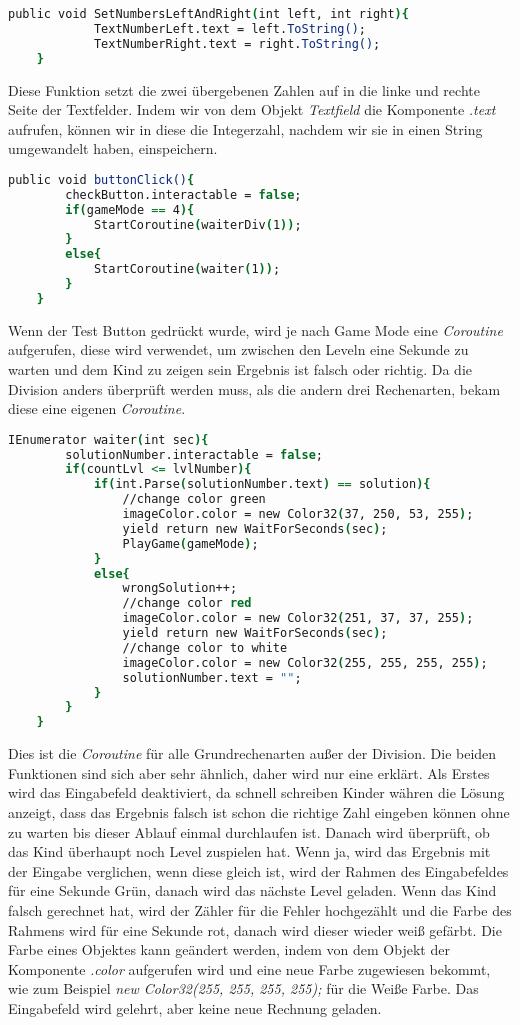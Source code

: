\begin{lstlisting}[language=csh, caption={MathOperations.cs SetTextLeftAndRight Funktion}]
	public void SetNumbersLeftAndRight(int left, int right){
			TextNumberLeft.text = left.ToString();
			TextNumberRight.text = right.ToString();
	}
\end{lstlisting}
Diese Funktion setzt die zwei übergebenen Zahlen auf in die linke und rechte Seite der Textfelder. Indem wir von dem Objekt \textit{Textfield} die Komponente \textit{.text} aufrufen, können wir in diese die Integerzahl, nachdem wir sie in einen String umgewandelt haben, einspeichern.\\
\begin{lstlisting}[language=csh, caption={MathOperations.cs ButtonClick Funktion}]
	public void buttonClick(){
		checkButton.interactable = false;
		if(gameMode == 4){
			StartCoroutine(waiterDiv(1));
		}
		else{
			StartCoroutine(waiter(1));
		}
	}
\end{lstlisting}
Wenn der Test Button gedrückt wurde, wird je nach Game Mode eine \textit{Coroutine} aufgerufen, diese wird verwendet, um zwischen den Leveln eine Sekunde zu warten und dem Kind zu zeigen sein Ergebnis ist falsch oder richtig. Da die Division anders überprüft werden muss, als die andern drei Rechenarten, bekam diese eine eigenen \textit{Coroutine}.\\
\begin{lstlisting}[language=csh, caption={MathOperations.cs waiter Funktion}]
	IEnumerator waiter(int sec){
		solutionNumber.interactable = false;
		if(countLvl <= lvlNumber){
			if(int.Parse(solutionNumber.text) == solution){
				//change color green
				imageColor.color = new Color32(37, 250, 53, 255);
				yield return new WaitForSeconds(sec);
				PlayGame(gameMode);
			}
			else{
				wrongSolution++;
				//change color red
				imageColor.color = new Color32(251, 37, 37, 255);
				yield return new WaitForSeconds(sec);
				//change color to white
				imageColor.color = new Color32(255, 255, 255, 255);
				solutionNumber.text = "";
			}
		}
	}
\end{lstlisting}
Dies ist die \textit{Coroutine} für alle Grundrechenarten außer der Division. Die beiden Funktionen sind sich aber sehr ähnlich, daher wird nur eine erklärt. Als Erstes wird das Eingabefeld deaktiviert, da schnell schreiben Kinder währen die Lösung anzeigt, dass das Ergebnis falsch ist schon die richtige Zahl eingeben können ohne zu warten bis dieser Ablauf einmal durchlaufen ist. Danach wird überprüft, ob das Kind überhaupt noch Level zuspielen hat. Wenn ja, wird das Ergebnis mit der Eingabe verglichen, wenn diese gleich ist, wird der Rahmen des Eingabefeldes für eine Sekunde Grün, danach wird das nächste Level geladen. Wenn das Kind falsch gerechnet hat, wird der Zähler für die Fehler hochgezählt und die Farbe des Rahmens wird für eine Sekunde rot, danach wird dieser wieder weiß gefärbt. Die Farbe eines Objektes kann geändert werden, indem von dem Objekt der Komponente \textit{.color} aufgerufen wird und eine neue Farbe zugewiesen bekommt, wie zum Beispiel \textit{new Color32(255, 255, 255, 255);} für die Weiße Farbe. Das Eingabefeld wird gelehrt, aber keine neue Rechnung geladen.\\

